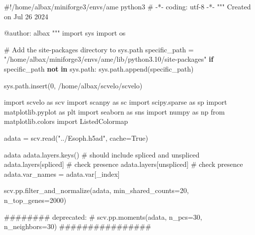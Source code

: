\documentclass[
  letterpaper,
  DIV=11,
  numbers=noendperiod]{scrreprt}
\newenvironment{Shaded}{\begin{snugshade}}{\end{snugshade}}
\newcommand{\CommentTok}[1]{\textcolor[rgb]{0.37,0.37,0.37}{#1}}
\newcommand{\ControlFlowTok}[1]{\textcolor[rgb]{0.00,0.23,0.31}{\textbf{#1}}}
\newcommand{\DecValTok}[1]{\textcolor[rgb]{0.68,0.00,0.00}{#1}}
\newcommand{\ImportTok}[1]{\textcolor[rgb]{0.00,0.46,0.62}{#1}}
\newcommand{\KeywordTok}[1]{\textcolor[rgb]{0.00,0.23,0.31}{\textbf{#1}}}
\newcommand{\NormalTok}[1]{\textcolor[rgb]{0.00,0.23,0.31}{#1}}
\newcommand{\OperatorTok}[1]{\textcolor[rgb]{0.37,0.37,0.37}{#1}}
\newcommand{\StringTok}[1]{\textcolor[rgb]{0.13,0.47,0.30}{#1}}
\newcommand{\VariableTok}[1]{\textcolor[rgb]{0.07,0.07,0.07}{#1}}
\begin{document}
\begin{Shaded}
\begin{Highlighting}[]
\CommentTok{\#!/home/albax/miniforge3/envs/ame python3}
\CommentTok{\# {-}*{-} coding: utf{-}8 {-}*{-}}
\CommentTok{"""}
\CommentTok{Created on Jul 26 2024}

\CommentTok{@author: albax}
\CommentTok{"""}
\ImportTok{import}\NormalTok{ sys}
\ImportTok{import}\NormalTok{ os}

\CommentTok{\# Add the site{-}packages directory to sys.path}
\NormalTok{specific\_path }\OperatorTok{=} \StringTok{"/home/albax/miniforge3/envs/ame/lib/python3.10/site{-}packages"}
\ControlFlowTok{if}\NormalTok{ specific\_path }\KeywordTok{not} \KeywordTok{in}\NormalTok{ sys.path:}
\NormalTok{    sys.path.append(specific\_path)}

\NormalTok{sys.path.insert(}\DecValTok{0}\NormalTok{, }\StringTok{\textquotesingle{}/home/albax/scvelo/scvelo\textquotesingle{}}\NormalTok{)}

\ImportTok{import}\NormalTok{ scvelo }\ImportTok{as}\NormalTok{ scv}
\ImportTok{import}\NormalTok{ scanpy }\ImportTok{as}\NormalTok{ sc}
\ImportTok{import}\NormalTok{ scipy.sparse }\ImportTok{as}\NormalTok{ sp}
\ImportTok{import}\NormalTok{ matplotlib.pyplot }\ImportTok{as}\NormalTok{ plt}
\ImportTok{import}\NormalTok{ seaborn }\ImportTok{as}\NormalTok{ sns}
\ImportTok{import}\NormalTok{ numpy }\ImportTok{as}\NormalTok{ np}
\ImportTok{from}\NormalTok{ matplotlib.colors }\ImportTok{import}\NormalTok{ ListedColormap}

\NormalTok{adata }\OperatorTok{=}\NormalTok{ scv.read(}\StringTok{"../Esoph.h5ad"}\NormalTok{, cache}\OperatorTok{=}\VariableTok{True}\NormalTok{)}

\NormalTok{adata}
\NormalTok{adata.layers.keys() }\CommentTok{\# should include spliced and unspliced}
\NormalTok{adata.layers[}\StringTok{\textquotesingle{}spliced\textquotesingle{}}\NormalTok{] }\CommentTok{\# check presence}
\NormalTok{adata.layers[}\StringTok{\textquotesingle{}unspliced\textquotesingle{}}\NormalTok{] }\CommentTok{\# check presence}
\NormalTok{adata.var\_names }\OperatorTok{=}\NormalTok{ adata.var[}\StringTok{\textquotesingle{}\_index\textquotesingle{}}\NormalTok{]}

\NormalTok{scv.pp.filter\_and\_normalize(adata, min\_shared\_counts}\OperatorTok{=}\DecValTok{20}\NormalTok{, n\_top\_genes}\OperatorTok{=}\DecValTok{2000}\NormalTok{)}

\CommentTok{\#\#\#\#\#\#\#\# deprecated: }
\CommentTok{\# scv.pp.moments(adata, n\_pcs=30, n\_neighbors=30)}
\CommentTok{\#\#\#\#\#\#\#\#\#\#\#\#\#\#\#\#}


\end{Highlighting}
\end{Shaded}
\end{document}
